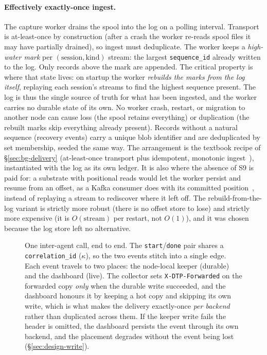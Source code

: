 \paragraph{Effectively exactly-once ingest.} The capture worker drains the
spool into the log on a polling interval. Transport is at-least-once by
construction (after a crash the worker re-reads spool files it may have
partially drained), so ingest must deduplicate. The worker keeps a
\emph{high-water mark} per \((\text{session}, \text{kind})\) stream: the
largest \texttt{sequence\_id} already written to the log. Only records
above the mark are appended. The critical property is where that state
lives: on startup the worker \emph{rebuilds the marks from the log
itself}, replaying each session's streams to find the highest sequence
present. The log is thus the single source of truth for what has been
ingested, and the worker carries no durable state of its own. No worker
crash, restart, or migration to another node can cause loss (the spool
retains everything) or duplication (the rebuilt marks skip everything
already present). Records without a natural sequence (recovery events) carry
a unique blob identifier and are deduplicated by set membership, seeded the
same way. The arrangement is the textbook recipe of \S\ref{sec:bg-delivery}
(at-least-once transport plus idempotent, monotonic
ingest~\cite{kleppmann2017ddia}), instantiated with the log as its own
ledger. It is also where the absence of S9 is paid for: a substrate with
positional reads would let the worker persist and resume from an offset, as
a Kafka consumer does with its committed position~\cite{narkhede2017kafka},
instead of replaying a stream to rediscover where it left off. The
rebuild-from-the-log variant is strictly more robust (there is no offset
store to lose) and strictly more expensive (it is $O(\text{stream})$ per
restart, not $O(1)$), and it was chosen because the log store left no
alternative.

\begin{figure}[t]
  \centering
  \resizebox{\linewidth}{!}{}
  \caption[One inter-agent call, end to end]{One inter-agent call, end to
  end. The \texttt{start}/\texttt{done} pair shares a
  \texttt{correlation\_id} ($\kappa$), so the two events stitch into a single
  edge. Each
  event travels to two places: the node-local keeper (durable) and the
  dashboard (live). The collector sets \texttt{X-DTP-Forwarded} on the
  forwarded copy \emph{only} when the durable write succeeded, and the
  dashboard honours it by keeping a hot copy and skipping its own write,
  which is what makes the delivery exactly-once \emph{per backend} rather
  than duplicated across them. If the keeper write fails the header is
  omitted, the dashboard persists the event through its own backend, and the
  placement degrades without the event being lost
  (\S\ref{sec:design-write}).}
  \label{fig:edge-sequence}
\end{figure}

